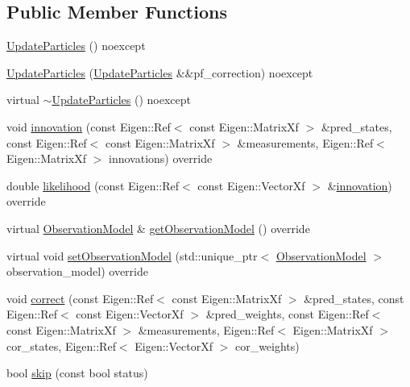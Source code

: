 \subsection*{Public Member Functions}
\begin{DoxyCompactItemize}
\item 
\mbox{\hyperlink{classbfl_1_1UpdateParticles_a7fdb4642d8a970b29f9fe70b6ece7152}{Update\+Particles}} () noexcept
\item 
\mbox{\hyperlink{classbfl_1_1UpdateParticles_ab905b2a4ac01d30c83e9092d524f0869}{Update\+Particles}} (\mbox{\hyperlink{classbfl_1_1UpdateParticles}{Update\+Particles}} \&\&pf\+\_\+correction) noexcept
\item 
virtual \mbox{\hyperlink{classbfl_1_1UpdateParticles_acd80b6402832fb4f2b8375505e26fa31}{$\sim$\+Update\+Particles}} () noexcept
\item 
void \mbox{\hyperlink{classbfl_1_1UpdateParticles_a8eb8aa7a1cbcf1b285401bc2b0dbed3e}{innovation}} (const Eigen\+::\+Ref$<$ const Eigen\+::\+Matrix\+Xf $>$ \&pred\+\_\+states, const Eigen\+::\+Ref$<$ const Eigen\+::\+Matrix\+Xf $>$ \&measurements, Eigen\+::\+Ref$<$ Eigen\+::\+Matrix\+Xf $>$ innovations) override
\item 
double \mbox{\hyperlink{classbfl_1_1UpdateParticles_a262b9de317562f0361f2db68312b8e27}{likelihood}} (const Eigen\+::\+Ref$<$ const Eigen\+::\+Vector\+Xf $>$ \&\mbox{\hyperlink{classbfl_1_1UpdateParticles_a8eb8aa7a1cbcf1b285401bc2b0dbed3e}{innovation}}) override
\item 
virtual \mbox{\hyperlink{classbfl_1_1ObservationModel}{Observation\+Model}} \& \mbox{\hyperlink{classbfl_1_1UpdateParticles_a673781f8cadbd148cb9a67a3f8532b37}{get\+Observation\+Model}} () override
\item 
virtual void \mbox{\hyperlink{classbfl_1_1UpdateParticles_a89e61d253d077f5c4ca0be6e3b56edd3}{set\+Observation\+Model}} (std\+::unique\+\_\+ptr$<$ \mbox{\hyperlink{classbfl_1_1ObservationModel}{Observation\+Model}} $>$ observation\+\_\+model) override
\item 
void \mbox{\hyperlink{classbfl_1_1PFCorrection_a7d8e7f910fe5ebcb7d8ed678c6f38836}{correct}} (const Eigen\+::\+Ref$<$ const Eigen\+::\+Matrix\+Xf $>$ \&pred\+\_\+states, const Eigen\+::\+Ref$<$ const Eigen\+::\+Vector\+Xf $>$ \&pred\+\_\+weights, const Eigen\+::\+Ref$<$ const Eigen\+::\+Matrix\+Xf $>$ \&measurements, Eigen\+::\+Ref$<$ Eigen\+::\+Matrix\+Xf $>$ cor\+\_\+states, Eigen\+::\+Ref$<$ Eigen\+::\+Vector\+Xf $>$ cor\+\_\+weights)
\item 
bool \mbox{\hyperlink{classbfl_1_1PFCorrection_ab25e625ea12fe257e0eb85d465835e62}{skip}} (const bool status)
\end{DoxyCompactItemize}
